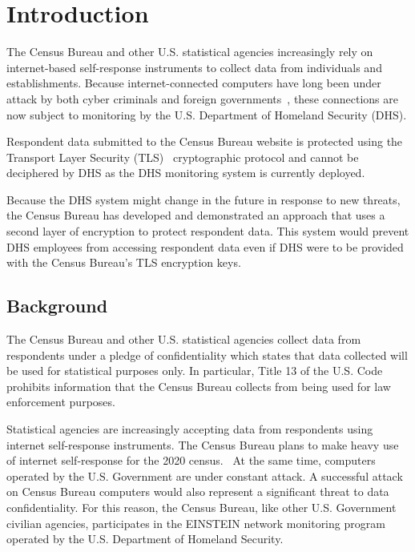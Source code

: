 \documentclass[fleqn,12pt]{wlscirep}
\begin{document}
\maketitle

\section{Introduction}

The Census Bureau and other U.S. statistical agencies increasingly
rely on internet-based self-response instruments to collect
data from individuals and establishments. Because internet-connected
computers have long been under attack by both cyber criminals and
foreign governments~\cite{dick-testimony}, these connections are now
subject to monitoring by the U.S. Department of Homeland
Security (DHS).

Respondent data submitted to the Census Bureau website is protected
using the Transport Layer Security (TLS)~\cite{rfc8446} cryptographic
protocol and cannot be deciphered by DHS as the DHS monitoring system
is currently deployed.

Because the DHS system might change in the future in response to
new threats, the Census Bureau has developed and demonstrated an
approach that uses a second layer of encryption to protect respondent
data. This system would prevent DHS employees from accessing
respondent data even if DHS were to be provided with the Census
Bureau's TLS encryption keys.

\subsection{Background}

The Census Bureau and other U.S. statistical agencies collect
data from respondents under a pledge of confidentiality which states
that data collected will be used for statistical purposes
only. In particular, Title 13 of the U.S. Code prohibits information
that the Census Bureau collects from being used for law enforcement
purposes.

Statistical agencies are increasingly accepting data from respondents
using internet self-response instruments. The Census
Bureau plans to make heavy use of internet self-response for the 2020
census.~\cite{pennington2016} 
At the same time, computers operated by the U.S. Government are under
constant attack. A successful attack on Census Bureau computers would
also represent a significant threat to data confidentiality. For this
reason, the Census Bureau, like other  U.S. Government 
civilian agencies, participates in the EINSTEIN network monitoring program
operated by the U.S. Department of Homeland Security.~\cite{thompson-feb2017}
\end{document}
